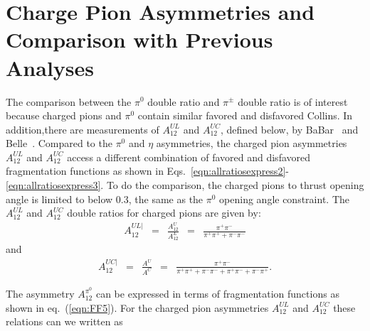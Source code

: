 \section{\texorpdfstring{Charge Pion Asymmetries and Comparison with Previous Analyses}{Comparison with Previous Analyses}}
\label{sec:comparewpreviouse}

The comparison between the $\pi^0$ double ratio and $\pi^{\pm}$ double ratio is of interest because charged pions and $\pi^0$ contain similar favored and disfavored Collins. In addition,there are measurements of $A^{UL}_{12}$ and $A^{UC}_{12}$, defined below, by BaBar~
\cite{BabarCharged} and Belle~\cite{ChargedPionResult2,ChargedPionResult}. Compared to the $\pi^0$ and $\eta$ asymmetries, the charged pion asymmetries $A^{UL}_{12}$ and $A^{UC}_{12}$ access a different combination of favored and disfavored fragmentation functions as shown in Eqs.~\eqref{eqn:allratiosexpress2}-\eqref{eqn:allratiosexpress3}. To do the comparison, the charged pions to thrust opening angle is limited to below 0.3, the same as the $\pi^0$ opening angle constraint.  The $A^{UL}_{12}$ and $A^{UC}_{12}$ double ratios for charged pions are given by: %
\begin{equation}
\begin{aligned}
A^{UL|}_{12}&=&\frac{A^U_{12}}{A^L_{12}}&=&\frac{\pi^+\pi^-}{\pi^+\pi^++\pi^-\pi^-}
\label{eqn:chargeddoubleratio1}
\end{aligned}
\end{equation}
and
\begin{equation}
\begin{aligned}
A^{UC|}_{12}&=&\frac{A^U}{A^C}&=&\frac{\pi^+\pi^-}{\pi^+\pi^++\pi^-\pi^-+\pi^+\pi^-+\pi^-\pi^+}.
\label{eqn:chargeddoubleratio2}
\end{aligned}
\end{equation}


The asymmetry $A_{12}^{\pi^0}$ can be expressed in terms of fragmentation functions as shown in eq.~(\ref{eqn:FF5}).%
For the charged pion asymmetries $A^{UL}_{12}$ and $A^{UC}_{12}$ these relations can we written as

